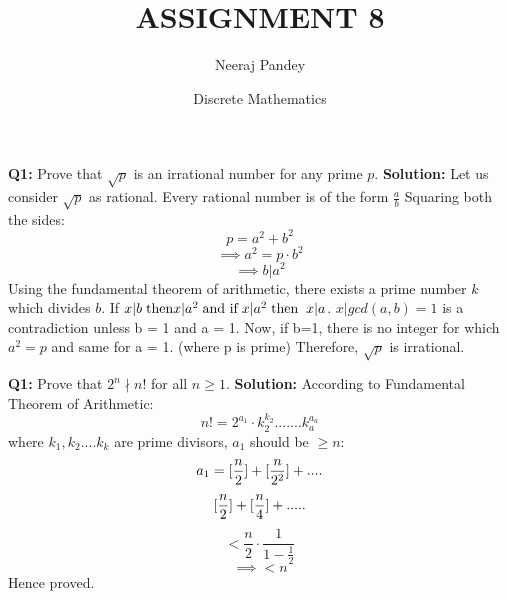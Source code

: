 \documentclass{article}
\title{ASSIGNMENT 8}
\author{Neeraj Pandey}
\date{Discrete Mathematics}
\begin{document}
\maketitle
\begin{flushleft}
\newcommand\tab[1][1cm]{\hspace*{#1}}
\textbf{Q1: } Prove that $\sqrt{p}$ is an irrational number for any prime $p$.
\newline
\newline
\textbf{Solution: } Let us consider $\sqrt{p}$ as rational.
\newline
Every rational number is of the form $\frac{a}{b}$
\newline
Squaring both the sides:
\[ p = a^2 + b^2\]
\[\implies a^2 = p \cdot b^2\]
\[\implies b|a^2\]
\newline
Using the fundamental theorem of arithmetic, there exists a prime number $k$ which divides $b$.
\newline
If $x|b \tab[0.1cm]{}\text{then} x|a^2 \tab[0.1cm] \text{and if}\tab[0.1cm] x|a^2 \tab[0.1cm]\text{then}\tab[0.2cm] x|a$.
\newline
\newline
$x|gcd(a, b) = 1$ is a contradiction unless b = 1 and a = 1.
\newline
\newline
Now, if b=1, there is no integer for which $a^2 = p$ and same for a = 1.
(where p is prime)
\newline
\newline
Therefore, $\sqrt{p}$ is irrational.
\newline
\newline

\end{flushleft}
\begin{flushleft}
\textbf{Q1: } Prove that $2^n \nmid n!$ for all $n \geq 1$.
\newline
\newline
\textbf{Solution: } According to Fundamental Theorem of Arithmetic:
\[n! = {2^{a_{1}}}\cdot{k_{2}^{k_{2}}}{.......}{k_{a}^{a_{a}}}\]
where $k_{1}, k_{2}....k_{k}$ are prime divisors,
\newline
$a_{1}$ should be $\geq n$:
\[ a_{1} = \small[\frac{n}{2}\small] + \small[\frac{n}{2^2}\small] + ....\]
\[ \small[\frac{n}{2}\small] + \small[\frac{n}{4}\small] + .....\]
\[< \frac{n}{2} \cdot \frac{1}{1-\frac{1}{2}}\]
\[\implies < n\]
\newline
\newline
Hence proved.
\end{flushleft}
\end{document}
